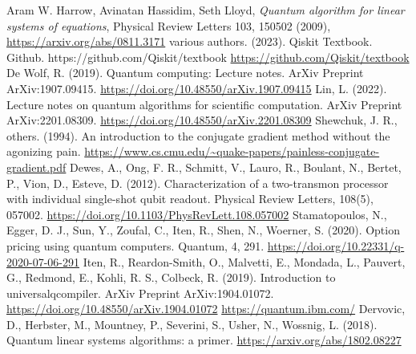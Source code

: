 \documentclass[12pt, oneside]{book}
\theoremstyle{definition}
\theoremstyle{definition}
\theoremstyle{remark}
\begin{document}
\begin{thebibliography}{9}
    Aram W. Harrow, Avinatan Hassidim, Seth Lloyd,
    \textit{Quantum algorithm for linear systems of equations},
    Physical Review Letters 103, 150502 (2009),
    \url{https://arxiv.org/abs/0811.3171}
    various authors. (2023). Qiskit Textbook. Github. https://github.com/Qiskit/textbook
    \url{https://github.com/Qiskit/textbook}
    De Wolf, R. (2019). Quantum computing: Lecture notes. ArXiv Preprint ArXiv:1907.09415.
    \url{https://doi.org/10.48550/arXiv.1907.09415}
    Lin, L. (2022). Lecture notes on quantum algorithms for scientific computation. ArXiv Preprint ArXiv:2201.08309.
    \url{https://doi.org/10.48550/arXiv.2201.08309}
    Shewchuk, J. R.,  others. (1994). An introduction to the conjugate gradient method without the agonizing pain.
    \url{https://www.cs.cmu.edu/~quake-papers/painless-conjugate-gradient.pdf}
    Dewes, A., Ong, F. R., Schmitt, V., Lauro, R., Boulant, N., Bertet, P., Vion, D.,  Esteve, D. (2012). Characterization of a two-transmon processor with individual single-shot qubit readout. Physical Review Letters, 108(5), 057002.
    \url{https://doi.org/10.1103/PhysRevLett.108.057002}
    Stamatopoulos, N., Egger, D. J., Sun, Y., Zoufal, C., Iten, R., Shen, N.,  Woerner, S. (2020). Option pricing using quantum computers. Quantum, 4, 291.
    \url{https://doi.org/10.22331/q-2020-07-06-291}
    Iten, R., Reardon-Smith, O., Malvetti, E., Mondada, L., Pauvert, G., Redmond, E., Kohli, R. S., Colbeck, R. (2019). Introduction to universalqcompiler. ArXiv Preprint ArXiv:1904.01072.
    \url{https://doi.org/10.48550/arXiv.1904.01072}
    \bibitem{}
    \url{https://quantum.ibm.com/}
    Dervovic, D., Herbster, M., Mountney, P., Severini, S., Usher, N., Wossnig, L. (2018). Quantum linear systems algorithms: a primer. \url{https://arxiv.org/abs/1802.08227}
\end{thebibliography}
\end{document}
